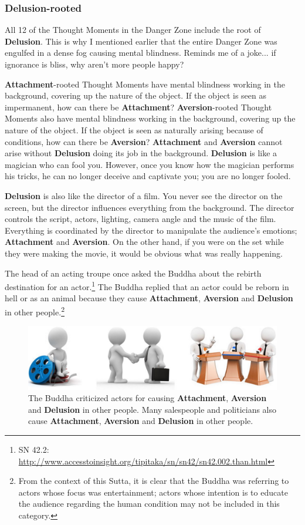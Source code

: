 \subsubsection*{Delusion-rooted}

All 12 of the Thought Moments in the Danger Zone include the root of \textbf{Delusion}. This is why I mentioned earlier that the entire Danger Zone was engulfed in a dense fog causing mental blindness. Reminds me of a joke... if ignorance is bliss, why aren’t more people happy?

\textbf{Attachment}-rooted Thought Moments have mental blindness working in the background, covering up the nature of the object. If the object is seen as impermanent, how can there be \textbf{Attachment}? \textbf{Aversion}-rooted Thought Moments also have mental blindness working in the background, covering up the nature of the object. If the object is seen as naturally arising because of conditions, how can there be \textbf{Aversion}? \textbf{Attachment} and \textbf{Aversion} cannot arise without \textbf{Delusion} doing its job in the background. \textbf{Delusion} is like a magician who can fool you. However, once you know how the magician performs his tricks, he can no longer deceive and captivate you; you are no longer fooled.

\textbf{Delusion} is also like the director of a film. You never see the director on the screen, but the director influences everything from the background. The director controls the script, actors, lighting, camera angle and the music of the film. Everything is coordinated by the director to manipulate the audience’s emotions; \textbf{Attachment} and \textbf{Aversion}. On the other hand, if you were on the set while they were making the movie, it would be obvious what was really happening.

The head of an acting troupe once asked the Buddha about the rebirth destination for an actor.\footnote{SN 42.2: \url{http://www.accesstoinsight.org/tipitaka/sn/sn42/sn42.002.than.html}} The Buddha replied that an actor could be reborn in hell or as an animal because they cause \textbf{Attachment}, \textbf{Aversion} and  \textbf{Delusion} in other people.\footnote{From the context of this Sutta, it is clear that the Buddha was referring to actors whose focus was entertainment; actors whose intention is to educate the audience regarding the human condition may not be included in this category.} 

\begin{figure}[h]
\centering
\includegraphics[width=1.0\linewidth]{./Diagrams/Actors}
\caption{The Buddha criticized actors for causing \textbf{Attachment}, \textbf{Aversion} and \textbf{Delusion} in other people. Many salespeople and politicians also cause \textbf{Attachment}, \textbf{Aversion} and \textbf{Delusion} in other people.}
\label{fig:Actors}
\end{figure}

